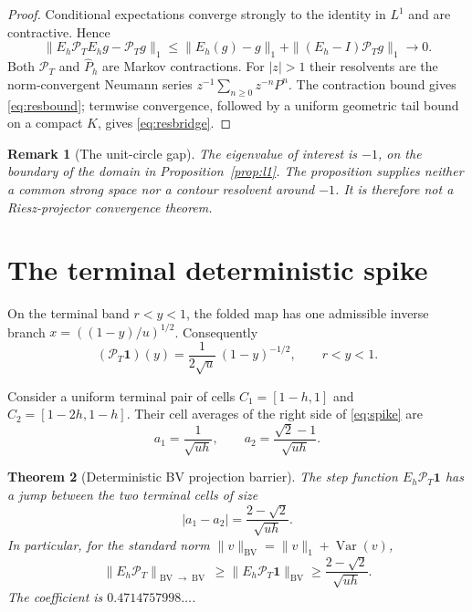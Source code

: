\documentclass[11pt]{article}
\newtheorem{theorem}{Theorem}[section]
\newtheorem{remark}[theorem]{Remark}
\newcommand{\PT}{\mathcal P_T}
\newcommand{\BV}{\operatorname{BV}}
\begin{document}
\begin{proof}
Conditional expectations converge strongly to the identity in $L^1$ and are
contractive.  Hence
\[
 \|E_h\PT E_hg-\PT g\|_1
 \leq \|E_h(g)-g\|_1+\|(E_h-I)\PT g\|_1\to0.
\]
Both $\PT$ and $\widehat P_h$ are Markov contractions.  For $|z|>1$ their
resolvents are the norm-convergent Neumann series
$z^{-1}\sum_{n\ge0}z^{-n}P^n$.  The contraction bound gives
\eqref{eq:resbound}; termwise convergence, followed by a uniform geometric
tail bound on a compact $K$, gives \eqref{eq:resbridge}.
\end{proof}

\begin{remark}[The unit-circle gap]
The eigenvalue of interest is $-1$, on the boundary of the domain in
Proposition~\ref{prop:l1}.  The proposition supplies neither a common
strong space nor a contour resolvent around $-1$.  It is therefore not a
Riesz-projector convergence theorem.
\end{remark}

\section{The terminal deterministic spike}

On the terminal band $r<y<1$, the folded map has one admissible inverse
branch $x=((1-y)/u)^{1/2}$.  Consequently
\begin{equation}
 (\PT\mathbf1)(y)=\frac{1}{2\sqrt u}\,(1-y)^{-1/2},
 \qquad r<y<1.
 \label{eq:spike}
\end{equation}

Consider a uniform terminal pair of cells
$C_1=[1-h,1]$ and $C_2=[1-2h,1-h]$.  Their cell averages of the right side
of \eqref{eq:spike} are
\begin{equation}
 a_1=\frac{1}{\sqrt{u h}},\qquad
 a_2=\frac{\sqrt2-1}{\sqrt{u h}}.
 \label{eq:averages}
\end{equation}

\begin{theorem}[Deterministic BV projection barrier]
\label{thm:spike}
The step function $E_h\PT\mathbf1$ has a jump between the two terminal
cells of size
\begin{equation}
 |a_1-a_2|=\frac{2-\sqrt2}{\sqrt{u h}}.
 \label{eq:jump}
\end{equation}
In particular, for the standard norm
$\|v\|_{\BV}=\|v\|_1+\operatorname{Var}(v)$,
\begin{equation}
 \|E_h\PT\|_{\BV\to\BV}
 \geq \|E_h\PT\mathbf1\|_{\BV}
 \geq \frac{2-\sqrt2}{\sqrt{u h}}.
 \label{eq:bvblowup}
\end{equation}
The coefficient is $0.4714757998\ldots$.
\end{theorem}
\end{document}
